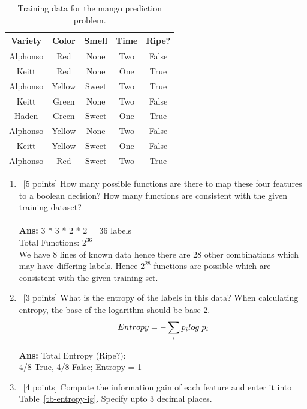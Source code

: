 \documentclass[12pt, fullpage,letterpaper]{article}
\begin{document}
\begin{enumerate}
  \begin{table}[h]
    \centering
    \begin{tabular}{cccc|c}
      \hline
      Variety & Color    & Smell  & Time & Ripe?  \\ \hline
      Alphonso& Red      & None   & Two  & False  \\
      Keitt   & Red      & None   & One  & True   \\
      Alphonso& Yellow   & Sweet  & Two  & True   \\
      Keitt   & Green    & None   & Two  & False  \\
      Haden   & Green    & Sweet  & One  & True   \\
      Alphonso& Yellow   & None   & Two  & False  \\
      Keitt   & Yellow   & Sweet  & One  & False  \\
      Alphonso& Red      & Sweet  & Two  & True   \\ \hline
    \end{tabular}
    \caption{Training data for the mango prediction problem.}\label{tb-mango-train}
  \end{table}


  \begin{enumerate}
  \item~[5 points] How many possible functions are there to map these four features to a boolean decision? How many functions are consistent with the given training dataset?\\\\
  \textbf{Ans: }3 * 3 * 2 * 2 = 36 labels\\
	Total Functions: $2^{36}$\\
    We have 8 lines of known data hence there are 28 other combinations which may have differing labels. Hence $2^{28}$ functions are possible which are consistent with the given training set.
  \item~[3 points] What is the entropy of the labels in this data? When calculating entropy, the base of the logarithm should be base 2.\\
  \[Entropy = -\sum_{i} p_ilog\hspace{1mm}p_i\]

 \textbf{Ans: }Total Entropy (Ripe?):\\
 4/8 True, 4/8 False; Entropy = 1
  
  \item~[4 points] Compute the information gain of each feature and enter it into Table~\ref{tb-entropy-ig}. Specify upto 3 decimal places.
    \begin{table}[h]
      \centering
      \begin{tabular}{c|c}


\end{tabular}
\end{table}
\end{enumerate}
\end{enumerate}
\end{document}
